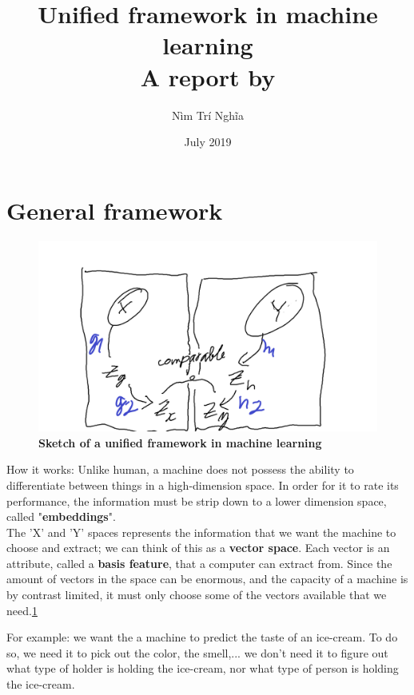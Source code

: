 \documentclass{article}
\title{Unified framework in machine learning\\A report by}
\author{Nìm Trí Nghĩa}
\date{July 2019}
\begin{document}
\maketitle

\section{General framework}
\begin{figure}[h]
    \includegraphics[width=12cm]{Untitled.png}
    \caption{\textbf{Sketch of a unified framework in machine learning}}
    \label{fig:1}
\end{figure}

How it works: Unlike human, a machine does not possess the ability to differentiate between things in a high-dimension space. In order for it to rate its performance, the information must be strip down to a lower dimension space, called "\textbf{embeddings}".\\

\hspace{1cm}The 'X' and 'Y' spaces represents the information that we want the machine to choose and extract; we can think of this as a \textbf{vector space}. Each vector is an attribute, called a \textbf{basis feature}, that a computer can extract from. Since the amount of vectors in the space can be enormous, and the capacity of a machine is by contrast limited, it must only choose some of the vectors available that we need.\ref{fig:1} 

\hspace{1cm}For example: we want the a machine to predict the taste of an ice-cream. To do so, we need it to pick out the color, the smell,... we don't need it to figure out what type of holder is holding the ice-cream, nor what type of person is holding the ice-cream.\\
\end{document}
